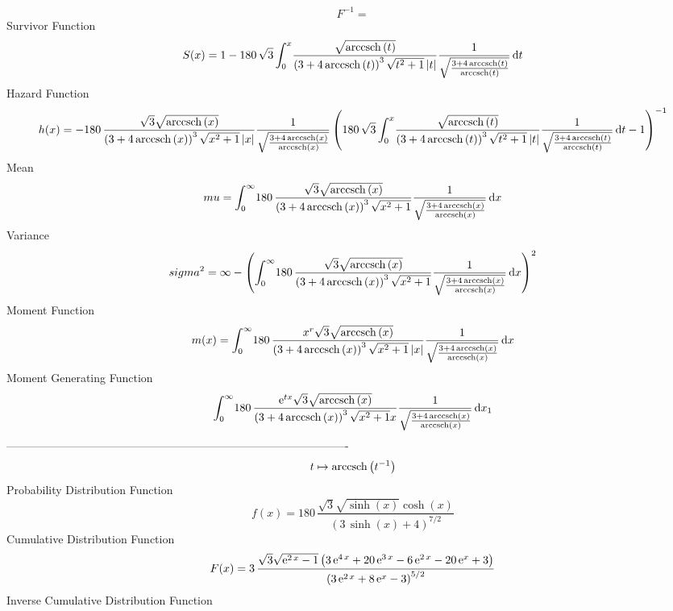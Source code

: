 \documentclass[12pt]{article}
\begin{document}
  $$F^{-1} = $$Survivor Function 
 $$ S(x)=1-180\,\sqrt {3}\int_{0}^{x}\!{\frac {\sqrt {{\rm arccsch} \left(t
\right)}}{ \left( 3+4\,{\rm arccsch} \left(t\right) \right) ^{3}\sqrt 
{{t}^{2}+1} \left| t \right| }{\frac {1}{\sqrt {{\frac {3+4\,
{\rm arccsch} \left(t\right)}{{\rm arccsch} \left(t\right)}}}}}}
\,{\rm d}t
$$ Hazard Function 
 $$ h(x)=-180\,{\frac {\sqrt {3}\sqrt {{\rm arccsch} \left(x\right)}}{ \left( 3
+4\,{\rm arccsch} \left(x\right) \right) ^{3}\sqrt {{x}^{2}+1} \left| 
x \right| }{\frac {1}{\sqrt {{\frac {3+4\,{\rm arccsch} \left(x\right)
}{{\rm arccsch} \left(x\right)}}}}} \left( 180\,\sqrt {3}\int_{0}^{x}
\!{\frac {\sqrt {{\rm arccsch} \left(t\right)}}{ \left( 3+4\,
{\rm arccsch} \left(t\right) \right) ^{3}\sqrt {{t}^{2}+1} \left| t
 \right| }{\frac {1}{\sqrt {{\frac {3+4\,{\rm arccsch} \left(t\right)
}{{\rm arccsch} \left(t\right)}}}}}}\,{\rm d}t-1 \right) ^{-1}}
$$Mean 
 $$ mu=\int_{0}^{\infty }\!180\,{\frac {\sqrt {3}\sqrt {{\rm arccsch} \left(x
\right)}}{ \left( 3+4\,{\rm arccsch} \left(x\right) \right) ^{3}\sqrt 
{{x}^{2}+1}}{\frac {1}{\sqrt {{\frac {3+4\,{\rm arccsch} \left(x
\right)}{{\rm arccsch} \left(x\right)}}}}}}\,{\rm d}x
$$ Variance 
 $$ sigma^2 = \infty - \left( \int_{0}^{\infty }\!180\,{\frac {\sqrt {3}\sqrt {
{\rm arccsch} \left(x\right)}}{ \left( 3+4\,{\rm arccsch} \left(x
\right) \right) ^{3}\sqrt {{x}^{2}+1}}{\frac {1}{\sqrt {{\frac {3+4\,
{\rm arccsch} \left(x\right)}{{\rm arccsch} \left(x\right)}}}}}}
\,{\rm d}x \right) ^{2}
$$Moment Function 
 $$ m(x) = \int_{0}^{\infty }\!180\,{\frac {{x}^{r}\sqrt {3}\sqrt {{\rm arccsch} 
\left(x\right)}}{ \left( 3+4\,{\rm arccsch} \left(x\right) \right) ^{3
}\sqrt {{x}^{2}+1} \left| x \right| }{\frac {1}{\sqrt {{\frac {3+4\,
{\rm arccsch} \left(x\right)}{{\rm arccsch} \left(x\right)}}}}}}
\,{\rm d}x
$$ Moment Generating Function 
 $$\int_{0}^{\infty }\!180\,{\frac {{{\rm e}^{tx}}\sqrt {3}\sqrt {
{\rm arccsch} \left(x\right)}}{ \left( 3+4\,{\rm arccsch} \left(x
\right) \right) ^{3}\sqrt {{x}^{2}+1}x}{\frac {1}{\sqrt {{\frac {3+4\,
{\rm arccsch} \left(x\right)}{{\rm arccsch} \left(x\right)}}}}}}
\,{\rm d}x_{{1}}
$$-------------------------------------------------------------------------------------------  \\$$t\mapsto {\rm arccsch} \left({t}^{-1}\right)
$$Probability Distribution Function 
$$  f(x)=180\,{\frac {\sqrt {3}\sqrt {\sinh \left( x \right) }\cosh \left( x
 \right) }{ \left( 3\,\sinh \left( x \right) +4 \right) ^{7/2}}}
$$Cumulative Distribution Function  
 $$F(x)=3\,{\frac {\sqrt {3}\sqrt {{{\rm e}^{2\,x}}-1} \left( 3\,{{\rm e}^{4\,
x}}+20\,{{\rm e}^{3\,x}}-6\,{{\rm e}^{2\,x}}-20\,{{\rm e}^{x}}+3
 \right) }{ \left( 3\,{{\rm e}^{2\,x}}+8\,{{\rm e}^{x}}-3 \right) ^{5/
2}}}
$$ Inverse Cumulative Distribution Function 
\end{document}
